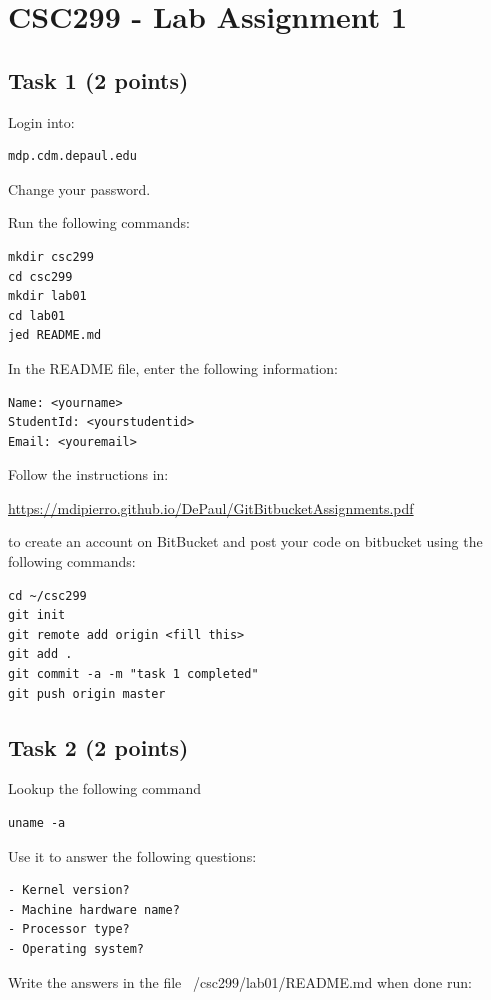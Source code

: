 \documentclass[12pt]{article}
\begin{document}
\section{CSC299 - Lab Assignment 1}

\subsection{Task 1 (2 points)}

Login into:
\begin{verbatim}
mdp.cdm.depaul.edu
\end{verbatim}

Change your password.

Run the following commands:

\begin{verbatim}  
mkdir csc299
cd csc299
mkdir lab01
cd lab01
jed README.md
\end{verbatim}

In the README file, enter the following information:

\begin{verbatim}
Name: <yourname>
StudentId: <yourstudentid>
Email: <youremail>
\end{verbatim}

Follow the instructions in:

\url{https://mdipierro.github.io/DePaul/GitBitbucketAssignments.pdf}

to create an account on BitBucket and post your code on bitbucket using the following commands:

\begin{verbatim}
cd ~/csc299
git init
git remote add origin <fill this>
git add .
git commit -a -m "task 1 completed"
git push origin master
\end{verbatim}

\subsection{Task 2 (2 points)}

Lookup the following command
\begin{verbatim}
uname -a
\end{verbatim}
Use it to answer the following questions:
\begin{verbatim}
- Kernel version?
- Machine hardware name?
- Processor type?
- Operating system?
\end{verbatim}
Write the answers in the file ~/csc299/lab01/README.md when done run:
\end{document}
